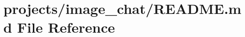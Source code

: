 \hypertarget{projects_2image__chat_2README_8md}{}\section{projects/image\+\_\+chat/\+R\+E\+A\+D\+ME.md File Reference}
\label{projects_2image__chat_2README_8md}
